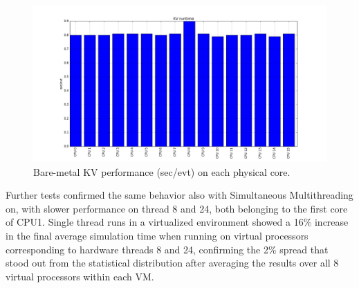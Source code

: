 \documentclass[a4paper]{jpconf}
\begin{document}
\begin{figure}[b]
\begin{center}
\includegraphics[scale=0.3]{images/kv_runtime.png}
\end{center}
\caption{\label{kv-runtime} Bare-metal KV performance (sec/evt) on each physical core. }
\end{figure}
Further tests confirmed the same behavior also with Simultaneous Multithreading 
on, with slower performance on thread 8 and 24, both belonging to the first core of 
CPU1. Single thread runs in a virtualized environment showed a 16\%
increase in the final average simulation time when running on virtual processors
corresponding to hardware threads 8 and 24, confirming the 2\%
spread that stood out from the statistical distribution after averaging the results
over all 8 virtual processors within each VM. 
\end{document}
